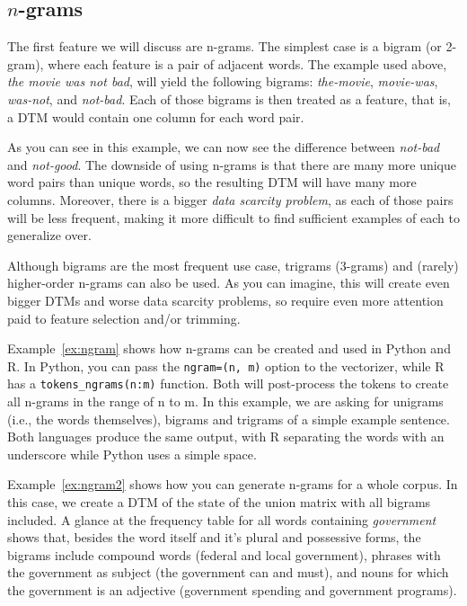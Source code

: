 \subsection{$n$-grams}\label{sec:ngrams}

The first feature we will discuss are n-grams.
The simplest case is a bigram (or 2-gram), where each feature is a pair of adjacent words.
The example used above, \emph{the movie was not bad}, will yield the following bigrams: \emph{the-movie}, \emph{movie-was}, \emph{was-not}, and \emph{not-bad}.
Each of those bigrams is then treated as a feature, that is, a DTM would contain one column for each word pair.

As you can see in this example, we can now see the difference between \emph{not-bad} and \emph{not-good}.
The downside of using n-grams is that there are many more unique word pairs than unique words,
so the resulting DTM will have many more columns.
Moreover, there is a bigger \emph{data scarcity problem}, as each of those pairs will be less frequent,
making it more difficult to find sufficient examples of each to generalize over.

Although bigrams are the most frequent use case, trigrams (3-grams) and (rarely) higher-order n-grams can also be used.
As you can imagine, this will create even bigger DTMs and worse data scarcity problems,
so require even more attention paid to feature selection and/or trimming.



Example~\ref{ex:ngram} shows how n-grams can be created and used in Python and R.
In Python, you can pass the \verb|ngram=(n, m)| option to the vectorizer,
while R has a \verb|tokens_ngrams(n:m)| function.
Both will post-process the tokens to create all n-grams in the range of n to m.
In this example, we are asking for unigrams (i.e., the words themselves), bigrams and trigrams of a simple example sentence.
Both languages produce the same output, with R separating the words with an underscore while Python uses a simple space.


Example~\ref{ex:ngram2} shows how you can generate n-grams for a whole corpus.
In this case, we create a DTM of the state of the union matrix with all bigrams included.
A glance at the frequency table for all words containing \emph{government} shows that,
besides the word itself and it's plural and possessive forms, the bigrams include compound words (federal and local government),
phrases with  the government as subject (the government can and must), and nouns for which the government is an adjective
(government spending and government programs).

